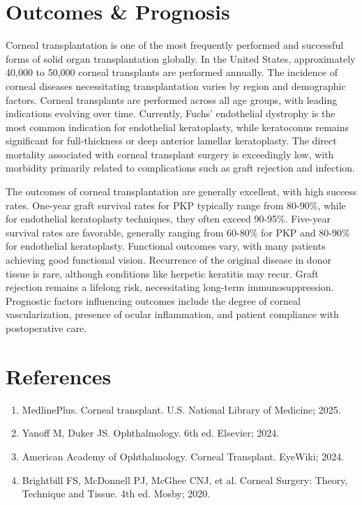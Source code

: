 \section*{Outcomes \& Prognosis}
Corneal transplantation is one of the most frequently performed and successful forms of solid organ transplantation globally. In the United States, approximately 40,000 to 50,000 corneal transplants are performed annually. The incidence of corneal diseases necessitating transplantation varies by region and demographic factors. Corneal transplants are performed across all age groups, with leading indications evolving over time. Currently, Fuchs' endothelial dystrophy is the most common indication for endothelial keratoplasty, while keratoconus remains significant for full-thickness or deep anterior lamellar keratoplasty. The direct mortality associated with corneal transplant surgery is exceedingly low, with morbidity primarily related to complications such as graft rejection and infection.

The outcomes of corneal transplantation are generally excellent, with high success rates. One-year graft survival rates for PKP typically range from 80-90\%, while for endothelial keratoplasty techniques, they often exceed 90-95\%. Five-year survival rates are favorable, generally ranging from 60-80\% for PKP and 80-90\% for endothelial keratoplasty. Functional outcomes vary, with many patients achieving good functional vision. Recurrence of the original disease in donor tissue is rare, although conditions like herpetic keratitis may recur. Graft rejection remains a lifelong risk, necessitating long-term immunosuppression. Prognostic factors influencing outcomes include the degree of corneal vascularization, presence of ocular inflammation, and patient compliance with postoperative care.

\section*{References}
\begin{enumerate}
  \item MedlinePlus. Corneal transplant. U.S. National Library of Medicine; 2025.
  \item Yanoff M, Duker JS. Ophthalmology. 6th ed. Elsevier; 2024.
  \item American Academy of Ophthalmology. Corneal Transplant. EyeWiki; 2024.
  \item Brightbill FS, McDonnell PJ, McGhee CNJ, et al. Corneal Surgery: Theory, Technique and Tissue. 4th ed. Mosby; 2020.
\end{enumerate}

\clearpage
